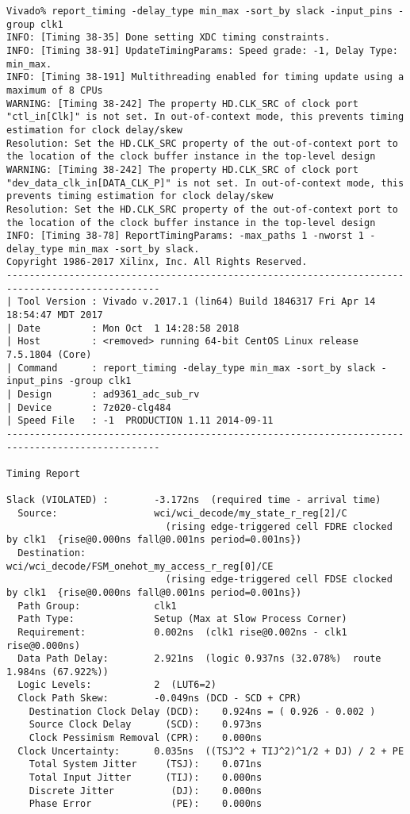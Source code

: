 \documentclass{article}
\begin{document}
\begin{lstlisting}
Vivado% report_timing -delay_type min_max -sort_by slack -input_pins -group clk1
INFO: [Timing 38-35] Done setting XDC timing constraints.
INFO: [Timing 38-91] UpdateTimingParams: Speed grade: -1, Delay Type: min_max.
INFO: [Timing 38-191] Multithreading enabled for timing update using a maximum of 8 CPUs
WARNING: [Timing 38-242] The property HD.CLK_SRC of clock port "ctl_in[Clk]" is not set. In out-of-context mode, this prevents timing estimation for clock delay/skew
Resolution: Set the HD.CLK_SRC property of the out-of-context port to the location of the clock buffer instance in the top-level design
WARNING: [Timing 38-242] The property HD.CLK_SRC of clock port "dev_data_clk_in[DATA_CLK_P]" is not set. In out-of-context mode, this prevents timing estimation for clock delay/skew
Resolution: Set the HD.CLK_SRC property of the out-of-context port to the location of the clock buffer instance in the top-level design
INFO: [Timing 38-78] ReportTimingParams: -max_paths 1 -nworst 1 -delay_type min_max -sort_by slack.
Copyright 1986-2017 Xilinx, Inc. All Rights Reserved.
-------------------------------------------------------------------------------------------------
| Tool Version : Vivado v.2017.1 (lin64) Build 1846317 Fri Apr 14 18:54:47 MDT 2017
| Date         : Mon Oct  1 14:28:58 2018
| Host         : <removed> running 64-bit CentOS Linux release 7.5.1804 (Core)
| Command      : report_timing -delay_type min_max -sort_by slack -input_pins -group clk1
| Design       : ad9361_adc_sub_rv
| Device       : 7z020-clg484
| Speed File   : -1  PRODUCTION 1.11 2014-09-11
-------------------------------------------------------------------------------------------------

Timing Report

Slack (VIOLATED) :        -3.172ns  (required time - arrival time)
  Source:                 wci/wci_decode/my_state_r_reg[2]/C
                            (rising edge-triggered cell FDRE clocked by clk1  {rise@0.000ns fall@0.001ns period=0.001ns})
  Destination:            wci/wci_decode/FSM_onehot_my_access_r_reg[0]/CE
                            (rising edge-triggered cell FDSE clocked by clk1  {rise@0.000ns fall@0.001ns period=0.001ns})
  Path Group:             clk1
  Path Type:              Setup (Max at Slow Process Corner)
  Requirement:            0.002ns  (clk1 rise@0.002ns - clk1 rise@0.000ns)
  Data Path Delay:        2.921ns  (logic 0.937ns (32.078%)  route 1.984ns (67.922%))
  Logic Levels:           2  (LUT6=2)
  Clock Path Skew:        -0.049ns (DCD - SCD + CPR)
    Destination Clock Delay (DCD):    0.924ns = ( 0.926 - 0.002 )
    Source Clock Delay      (SCD):    0.973ns
    Clock Pessimism Removal (CPR):    0.000ns
  Clock Uncertainty:      0.035ns  ((TSJ^2 + TIJ^2)^1/2 + DJ) / 2 + PE
    Total System Jitter     (TSJ):    0.071ns
    Total Input Jitter      (TIJ):    0.000ns
    Discrete Jitter          (DJ):    0.000ns
    Phase Error              (PE):    0.000ns


\end{lstlisting}
\end{document}
